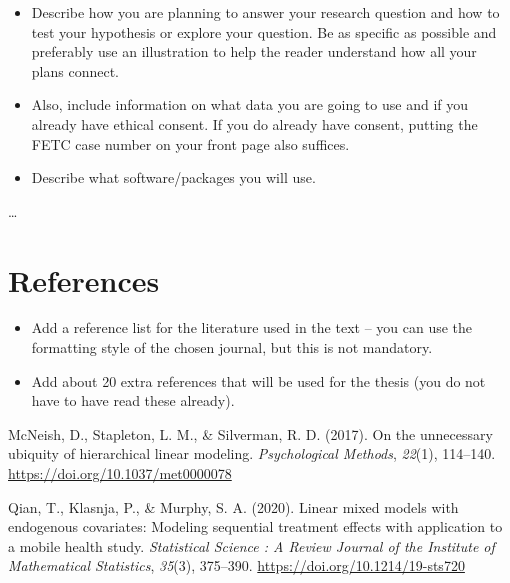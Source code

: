\documentclass[
  12pt,
  a4paper,
]{article}
\providecommand{\tightlist}{%
  \setlength{\itemsep}{0pt}\setlength{\parskip}{0pt}}\usepackage{longtable,booktabs,array}
\newlength{\cslhangindent}
\newlength{\cslentryspacingunit} %
\newenvironment{CSLReferences}[2] %
 {%
  \setlength{\parindent}{0pt}
  \ifodd #1
  \let\oldpar\par
  \def\par{\hangindent=\cslhangindent\oldpar}
  \fi
  \setlength{\parskip}{#2\cslentryspacingunit}
 }%
 {}
\begin{document}
\begin{itemize}
\tightlist
\item
  Describe how you are planning to answer your research question and how
  to test your hypothesis or explore your question. Be as specific as
  possible and preferably use an illustration to help the reader
  understand how all your plans connect.
\item
  Also, include information on what data you are going to use and if you
  already have ethical consent. If you do already have consent, putting
  the FETC case number on your front page also suffices.
\item
  Describe what software/packages you will use.
\end{itemize}

\ldots{}

\newpage

\hypertarget{references}{%
\section{References}\label{references}}

\begin{itemize}
\tightlist
\item
  Add a reference list for the literature used in the text -- you can
  use the formatting style of the chosen journal, but this is not
  mandatory.
\item
  Add about 20 extra references that will be used for the thesis (you do
  not have to have read these already).
\end{itemize}

\hypertarget{refs}{}
\begin{CSLReferences}{1}{0}
\leavevmode{}%
McNeish, D., Stapleton, L. M., \& Silverman, R. D. (2017). On the
unnecessary ubiquity of hierarchical linear modeling.
\emph{Psychological Methods}, \emph{22}(1), 114--140.
\url{https://doi.org/10.1037/met0000078}

\leavevmode{}%
Qian, T., Klasnja, P., \& Murphy, S. A. (2020). Linear mixed models with
endogenous covariates: Modeling sequential treatment effects with
application to a mobile health study. \emph{Statistical Science : A
Review Journal of the Institute of Mathematical Statistics},
\emph{35}(3), 375--390. \url{https://doi.org/10.1214/19-sts720}

\end{CSLReferences}
\end{document}
